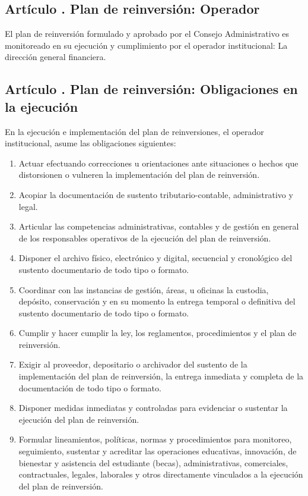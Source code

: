 \subsection{Artículo . Plan de reinversión: Operador}
\addtocounter{ns}{1}
El plan de reinversión formulado y aprobado por el Consejo Administrativo es monitoreado en su ejecución y cumplimiento por el operador institucional: La dirección general financiera. 
\subsection{Artículo . Plan de reinversión: Obligaciones en la ejecución}
\addtocounter{ns}{1}
En la ejecución e implementación del plan de reinversiones, el operador institucional, asume las obligaciones siguientes: 
\begin{enumerate}
\item Actuar efectuando correcciones u orientaciones ante situaciones o hechos que distorsionen o vulneren la implementación del plan de reinversión. 
\item Acopiar la documentación de sustento tributario-contable, administrativo y legal. 
\item Articular las competencias administrativas, contables y de gestión en general de los responsables operativos de la ejecución del plan de reinversión. 
\item Disponer el archivo físico, electrónico y digital, secuencial y cronológico del sustento documentario de todo tipo o formato. 
\item Coordinar con las instancias de gestión, áreas, u oficinas la custodia, depósito, conservación y en su momento la entrega temporal o definitiva del sustento documentario de todo tipo o formato. 
\item Cumplir y hacer cumplir la ley, los reglamentos, procedimientos y el plan de reinversión.   
\item Exigir al proveedor, depositario o archivador del sustento de la implementación del plan de reinversión, la entrega inmediata y completa de la documentación de todo tipo o formato. 
\item Disponer medidas inmediatas y controladas para evidenciar o sustentar la ejecución del plan de reinversión. 
\item Formular lineamientos, políticas, normas y procedimientos para monitoreo, seguimiento, sustentar y acreditar las operaciones educativas, innovación, de bienestar y asistencia del estudiante (becas), administrativas, comerciales, contractuales, legales, laborales y otros directamente vinculados a la ejecución del plan de reinversión.  

\end{enumerate}

